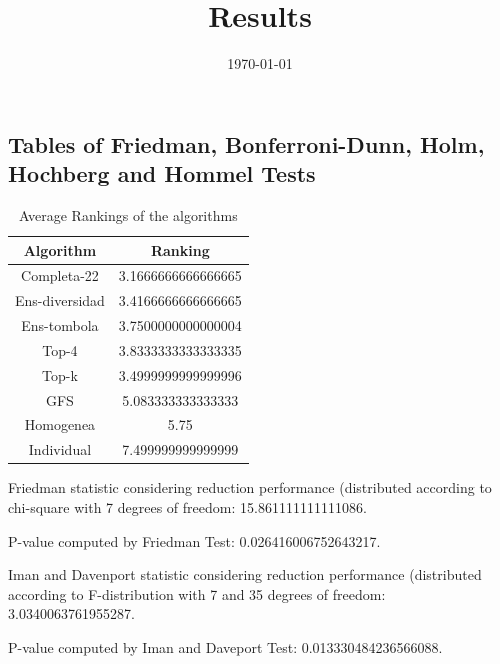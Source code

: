 \documentclass[a4paper,10pt]{article}
\title{Results}
\author{}
\date{\today}
\begin{document}
\begin{landscape}
\oddsidemargin 0in \topmargin 0in\maketitle
\section{Tables of Friedman, Bonferroni-Dunn, Holm, Hochberg and Hommel Tests}
\begin{table}[!htp]
\centering
\caption{Average Rankings of the algorithms
}\begin{tabular}{c|c}
Algorithm&Ranking\\
\hline
Completa-22&3.1666666666666665\\
Ens-diversidad&3.4166666666666665\\
Ens-tombola&3.7500000000000004\\
Top-4&3.8333333333333335\\
Top-k&3.4999999999999996\\
GFS&5.083333333333333\\
Homogenea&5.75\\
Individual&7.499999999999999\\
\end{tabular}
\end{table}


Friedman statistic considering reduction performance (distributed according to chi-square with 7 degrees of freedom: 15.861111111111086.


P-value computed by Friedman Test: 0.026416006752643217.\newline

Iman and Davenport statistic considering reduction performance (distributed according to F-distribution with 7 and 35 degrees of freedom: 3.0340063761955287.


P-value computed by Iman and Daveport Test: 0.013330484236566088.\newline


\end{landscape}
\end{document}
